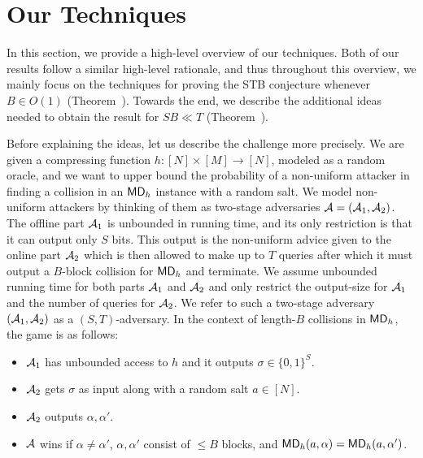 
\section{Our Techniques}\label{sec:techov}
In this section, we provide a high-level overview of our techniques. Both of our results follow a similar high-level rationale, and thus throughout this overview, we mainly focus on the techniques for proving the STB conjecture whenever $B\in O(1)$ (Theorem~). Towards the end, we describe the additional ideas needed to obtain the result for $SB\ll T$ (Theorem~).


Before explaining the ideas, let us describe the challenge more precisely. We are given a compressing function $h:[N]\times [M]\to [N]$, modeled as a random oracle, and we want to upper bound the probability of a non-uniform attacker in finding a collision in an $\mathsf{MD}_h$ instance with a random salt. We model non-uniform attackers by thinking of them as two-stage adversaries $\mathcal{A} = (\mathcal{A}_1,\mathcal{A}_2)$. The offline part $\mathcal{A}_1$ is unbounded in running time, and its only restriction is that it can output only $S$ bits. This output is the non-uniform advice given to the online part $\mathcal{A}_2$ which is then allowed to make up to $T$ queries after which it must output a $B$-block collision for $\mathsf{MD}_h$ and terminate. We assume unbounded running time for both parts $\mathcal{A}_1$ and $\mathcal{A}_2$ and only restrict the output-size for $\mathcal{A}_1$ and the number of queries for $\mathcal{A}_2$. We refer to such a two-stage adversary $(\mathcal{A}_1,\mathcal{A}_2)$ as a $(S,T)$-adversary. In the context of length-$B$ collisions in $\mathsf{MD}_h$, the game is as follows:
\begin{itemize}
    \item $\mathcal{A}_1$ has unbounded access to $h$ and it outputs $\sigma\in \{0,1\}^S$.
    \item  $\mathcal{A}_2$ gets $\sigma$ as input along with a random salt $a\in [N]$.
    \item $\mathcal{A}_2$ outputs $\alpha,\alpha'$. 
    \item $\mathcal{A}$ wins if $\alpha\neq \alpha'$, $\alpha,\alpha'$ consist of $\le B$ blocks, and $\mathsf{MD}_h(a,\alpha)=\mathsf{MD}_h(a,\alpha')$.
\end{itemize}


